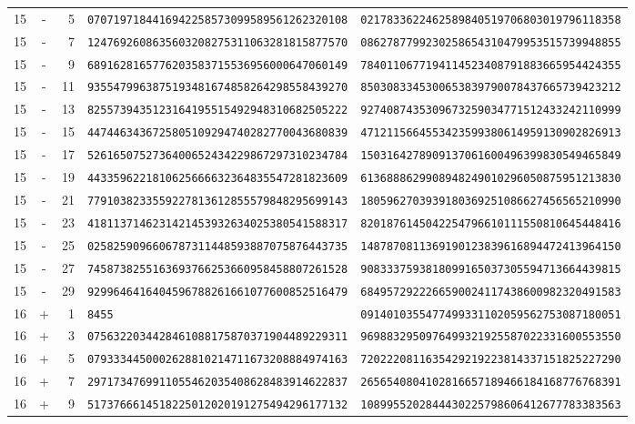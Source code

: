 \begin{longtable}{@{}rcrll@{}}
15&-&5&\texttt{0707197184416942258573099589561262320108}&\texttt{0217833622462589840519706803019796118358}\\
15&-&7&\texttt{1247692608635603208275311063281815877570}&\texttt{0862787799230258654310479953515739948855}\\
15&-&9&\texttt{6891628165776203583715536956000647060149}&\texttt{7840110677194114523408791883665954424355}\\
15&-&11&\texttt{9355479963875193481674858264298558439270}&\texttt{8503083345300653839790078437665739423212}\\
15&-&13&\texttt{8255739435123164195515492948310682505222}&\texttt{9274087435309673259034771512433242110999}\\
15&-&15&\texttt{4474463436725805109294740282770043680839}&\texttt{4712115664553423599380614959130902826913}\\
15&-&17&\texttt{5261650752736400652434229867297310234784}&\texttt{1503164278909137061600496399830549465849}\\
15&-&19&\texttt{4433596221810625666632364835547281823609}&\texttt{6136888629908948249010296050875951213830}\\
15&-&21&\texttt{7791038233559227813612855579848295699143}&\texttt{1805962703939180369251086627456565210990}\\
15&-&23&\texttt{4181137146231421453932634025380541588317}&\texttt{8201876145042254796610111550810645448416}\\
15&-&25&\texttt{0258259096606787311448593887075876443735}&\texttt{1487870811369190123839616894472413964150}\\
15&-&27&\texttt{7458738255163693766253660958458807261528}&\texttt{9083337593818099165037305594713664439815}\\
15&-&29&\texttt{9299646416404596788261661077600852516479}&\texttt{6849572922266590024117438600982320491583}\\
16&+&1&\texttt{8455}&\texttt{0914010355477499331102059562753087180051}\\
16&+&3&\texttt{0756322034428461088175870371904489229311}&\texttt{9698832950976499321925587022331600553550}\\
16&+&5&\texttt{0793334450002628810214711673208884974163}&\texttt{7202220811635429219223814337151825227290}\\
16&+&7&\texttt{2971734769911055462035408628483914622837}&\texttt{2656540804102816657189466184168776768391}\\
16&+&9&\texttt{5173766614518225012020191275494296177132}&\texttt{1089955202844430225798606412677783383563}\\

\end{longtable}
